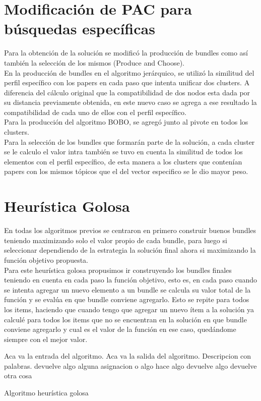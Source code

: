 \section{Modificación de PAC para búsquedas específicas}
Para la obtención de la solución se modificó la producción de bundles como así también la 
selección de los mismos (Produce and Choose). \\
En la producción de bundles en el algoritmo jerárquico, se utilizó la similitud del perfil 
específico con los papers en cada paso que intenta unificar dos clusters. A diferencia del cálculo 
original que la compatibilidad de dos nodos esta dada por su distancia previamente obtenida, en 
este nuevo caso se agrega a ese resultado la compatibilidad de cada uno de ellos con el perfil 
específico. \\
Para la producción del algoritmo BOBO, se agregó junto al pivote en todos los clusters. \\
Para la selección de los bundles que formarán parte de la solución, a cada cluster se le 
calculo el valor intra también se tuvo en cuenta la similitud de todos los elementos con el perfil  
específico, de esta manera a los clusters que contenían papers con los mismos tópicos que el del 
vector especifico se le dio mayor peso.

\section{Heurística Golosa}
En todas los algoritmos previos se centraron en primero construir buenos bundles teniendo 
maximizando solo el valor propio de cada bundle, para luego si seleccionar dependiendo de la 
estrategia la solución final ahora si maximizando la función objetivo propuesta.\\
Para este heurística golosa propusimos ir construyendo los bundles finales teniendo en cuenta en 
cada paso la función objetivo, esto es, en cada paso cuando se intenta agregar un nuevo elemento a 
un bundle se calcula su valor total de la función y se evalúa en que bundle conviene agregarlo. 
Esto se repite para todos los items, haciendo que cuando tengo que agregar un nuevo ítem a la 
solución ya calculé para todos los items que no se encuentran en la solución en que bundle conviene 
agregarlo y cual es el valor de la función en ese caso, quedándome siempre con el mejor valor.
\begin{algorithm}[H]
\begin{algorithmic}[1]
\REQUIRE Aca va la entrada del algoritmo.
\ENSURE Aca va la salida del algoritmo.
\STATE Descripcion con palabras.
\RETURN devuelve algo
\ELSE
\STATE alguna asignacion o algo
\ENDIF
\ENDWHILE
{}
\STATE hace algo
\RETURN devuelve algo
\ENDIF
\ENDFOR
\RETURN devuelve otra cosa
\end{algorithmic}
\caption{Algoritmo heurística golosa}\label{alg:algHeuGol}
\end{algorithm}
